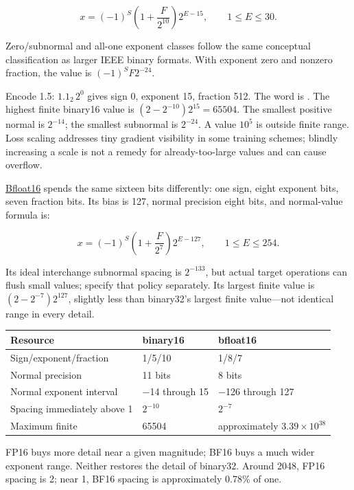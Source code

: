 \[
x=(-1)^S\left(1+\frac{F}{2^{10}}\right)2^{E-15},
\qquad 1\le E\le30.
\]

Zero/subnormal and all-one exponent classes follow the same conceptual classification as larger IEEE binary formats. With exponent zero and nonzero fraction, the value is \((-1)^SF2^{-24}\).

Encode 1.5: \(1.1_2\,2^0\) gives sign 0, exponent 15, fraction 512. The word is . The highest finite binary16 value is \((2-2^{-10})2^{15}=65504\). The smallest positive normal is \(2^{-14}\); the smallest subnormal is \(2^{-24}\). A value \(10^5\) is outside finite range. Loss scaling addresses tiny gradient visibility in some training schemes; blindly increasing a scale is not a remedy for already-too-large values and can cause overflow.

\hyperref[appendix-18b8dd966b5d]{Bfloat16} spends the same sixteen bits differently: one sign, eight exponent bits, seven fraction bits. Its bias is 127, normal precision eight bits, and normal-value formula is:

\[
x=(-1)^S\left(1+\frac{F}{2^7}\right)2^{E-127},
\qquad1\le E\le254.
\]

Its ideal interchange subnormal spacing is \(2^{-133}\), but actual target operations can flush small values; specify that policy separately. Its largest finite value is \((2-2^{-7})2^{127}\), slightly less than binary32's largest finite value---not identical range in every detail.

{\def\LTcaptype{none} %
\begin{longtable}[]{@{}lll@{}}
\toprule\noalign{}
Resource & binary16 & bfloat16 \\
\midrule\noalign{}
\endhead
\bottomrule\noalign{}
\endlastfoot
Sign/exponent/fraction & 1/5/10 & 1/8/7 \\
Normal precision & 11 bits & 8 bits \\
Normal exponent interval & −14 through 15 & −126 through 127 \\
Spacing immediately above 1 & \(2^{-10}\) & \(2^{-7}\) \\
Maximum finite & 65504 & approximately \(3.39\times10^{38}\) \\
\end{longtable}
}

FP16 buys more detail near a given magnitude; BF16 buys a much wider exponent range. Neither restores the detail of binary32. Around 2048, FP16 spacing is 2; near 1, BF16 spacing is approximately 0.78\% of one.

